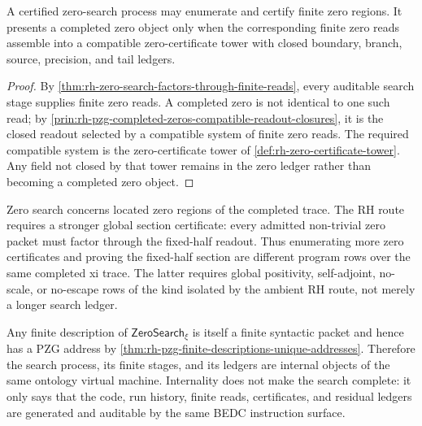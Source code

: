 \begin{theorem}
\label{thm:rh-certified-zeros-require-closure-beyond-search}
A certified zero-search process may enumerate and certify finite zero
regions.  It presents a completed zero object only when the corresponding
finite zero reads assemble into a compatible zero-certificate tower with
closed boundary, branch, source, precision, and tail ledgers.
\end{theorem}

\begin{proof}
By \autoref{thm:rh-zero-search-factors-through-finite-reads}, every
auditable search stage supplies finite zero reads.  A completed zero is
not identical to one such read; by
\autoref{prin:rh-pzg-completed-zeros-compatible-readout-closures}, it is
the closed readout selected by a compatible system of finite zero reads.
The required compatible system is the zero-certificate tower of
\autoref{def:rh-zero-certificate-tower}.  Any field not closed by that
tower remains in the zero ledger rather than becoming a completed zero
object.
\end{proof}

\begin{principle}
\label{prin:rh-proof-not-zero-enumeration}
Zero search concerns located zero regions of the completed trace.  The RH
route requires a stronger global section certificate: every admitted
non-trivial zero packet must factor through the fixed-half readout.  Thus
enumerating more zero certificates and proving the fixed-half section are
different program rows over the same completed xi trace.  The latter
requires global positivity, self-adjoint, no-scale, or no-escape rows of
the kind isolated by the ambient RH route, not merely a longer search
ledger.
\end{principle}

\begin{principle}
\label{prin:rh-zero-search-code-internal-object}
Any finite description of
$\mathsf{ZeroSearch}_{\xi}$ is itself a finite syntactic packet and hence
has a PZG address by
\autoref{thm:rh-pzg-finite-descriptions-unique-addresses}.  Therefore the
search process, its finite stages, and its ledgers are internal objects
of the same ontology virtual machine.  Internality does not make the
search complete: it only says that the code, run history, finite reads,
certificates, and residual ledgers are generated and auditable by the
same BEDC instruction surface.
\end{principle}
